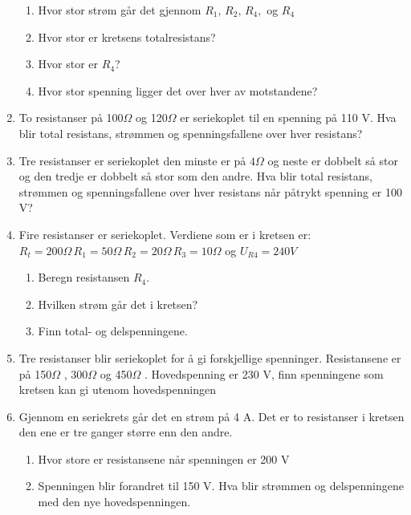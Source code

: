 \documentclass[12pt,a4paper]{article}
\begin{document}
\begin{enumerate}
\begin{enumerate}
\item Hvor stor strøm går det gjennom $R_{1},\,R_{2},\,R_{4},$ og $R_{4}$ 
\item Hvor stor er kretsens totalresistans?
\item Hvor stor er $R_{4}$?
\item Hvor stor spenning ligger det over hver av motstandene?
\end{enumerate}
\item To resistanser på 100$\Omega$ og 120$\Omega$ er seriekoplet til
en spenning på 110 V. Hva blir total resistans, strømmen og spenningsfallene
over hver resistans? 
\item Tre resistanser er seriekoplet den minste er på $4\Omega$ og neste
er dobbelt så stor og den tredje er dobbelt så stor som den andre.
Hva blir total resistans, strømmen og spenningsfallene over hver resistans
når påtrykt spenning er 100 V?
\item Fire resistanser er seriekoplet. Verdiene som er i kretsen er: $R_{t}=200\Omega\,R_{1}=50\Omega\,R_{2}=20\Omega\,R_{3}=10\Omega$
og $U_{R4}=240V$

\begin{enumerate}
\item Beregn resistansen $R_{4}$.
\item Hvilken strøm går det i kretsen?
\item Finn total- og delspenningene.
\end{enumerate}
\item Tre resistanser blir seriekoplet for å gi forskjellige spenninger.
Resistansene er på 150\foreignlanguage{english}{$\Omega$} , 300$\Omega$
og 450$\Omega$ . Hovedspenning er 230 V, finn spenningene som kretsen
kan gi utenom hovedspenningen
\item Gjennom en seriekrets går det en strøm på 4 A. Det er to resistanser
i kretsen den ene er tre ganger større enn den andre. 

\begin{enumerate}
\item Hvor store er resistansene når spenningen er 200 V
\item Spenningen blir forandret til 150 V. Hva blir strømmen og delspenningene
med den nye hovedspenningen.
\end{enumerate}
\end{enumerate}
\end{document}
